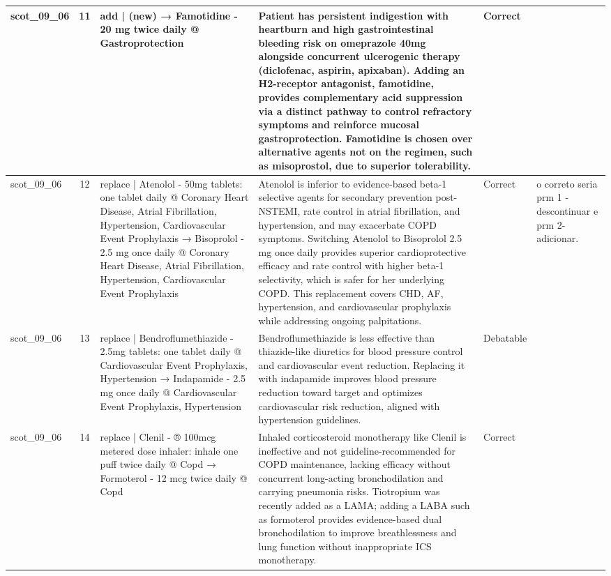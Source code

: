 \begin{longtable}{|p{1.45cm}|c|p{3.3cm}|p{6.5cm}|p{1.55cm}|p{2.3cm}|}
\hline
scot\_09\_06 & 11 & add | (new) → Famotidine - 20 mg twice daily @ Gastroprotection & Patient has persistent indigestion with heartburn and high gastrointestinal bleeding risk on omeprazole 40mg alongside concurrent ulcerogenic therapy (diclofenac, aspirin, apixaban). Adding an H2-receptor antagonist, famotidine, provides complementary acid suppression via a distinct pathway to control refractory symptoms and reinforce mucosal gastroprotection. Famotidine is chosen over alternative agents not on the regimen, such as misoprostol, due to superior tolerability. & Correct &  \\
\hline
scot\_09\_06 & 12 & replace | Atenolol - 50mg tablets: one tablet daily @ Coronary Heart Disease, Atrial Fibrillation, Hypertension, Cardiovascular Event Prophylaxis → Bisoprolol - 2.5 mg once daily @ Coronary Heart Disease, Atrial Fibrillation, Hypertension, Cardiovascular Event Prophylaxis & Atenolol is inferior to evidence-based beta-1 selective agents for secondary prevention post-NSTEMI, rate control in atrial fibrillation, and hypertension, and may exacerbate COPD symptoms. Switching Atenolol to Bisoprolol 2.5 mg once daily provides superior cardioprotective efficacy and rate control with higher beta-1 selectivity, which is safer for her underlying COPD. This replacement covers CHD, AF, hypertension, and cardiovascular prophylaxis while addressing ongoing palpitations. & Correct & o correto seria prm 1 - descontinuar e prm 2- adicionar. \\
\hline
scot\_09\_06 & 13 & replace | Bendroflumethiazide - 2.5mg tablets: one tablet daily @ Cardiovascular Event Prophylaxis, Hypertension → Indapamide - 2.5 mg once daily @ Cardiovascular Event Prophylaxis, Hypertension & Bendroflumethiazide is less effective than thiazide-like diuretics for blood pressure control and cardiovascular event reduction. Replacing it with indapamide improves blood pressure reduction toward target and optimizes cardiovascular risk reduction, aligned with hypertension guidelines. & Debatable &  \\
\hline
scot\_09\_06 & 14 & replace | Clenil - ® 100mcg metered dose inhaler: inhale one puff twice daily @ Copd → Formoterol - 12 mcg twice daily @ Copd & Inhaled corticosteroid monotherapy like Clenil is ineffective and not guideline-recommended for COPD maintenance, lacking efficacy without concurrent long-acting bronchodilation and carrying pneumonia risks. Tiotropium was recently added as a LAMA; adding a LABA such as formoterol provides evidence-based dual bronchodilation to improve breathlessness and lung function without inappropriate ICS monotherapy. & Correct &  \\

\end{longtable}
